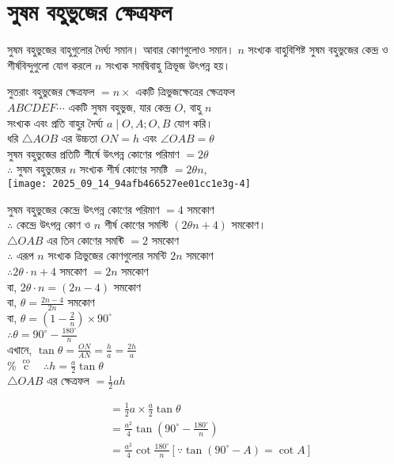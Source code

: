 \documentclass[10pt]{article}
\begin{document}
\section*{সুষম বহুভুজের ক্ষেত্রফল}
সুষম বহুভুজের বাহুগুলোর দৈর্ঘ্য সমান। আবার কোণগুলোও সমান। \(n\) সংখ্যক বাহুবিশিষ্ট সুষম বহুভুজের কেন্দ্র ও শীর্ষবিন্দুগুলো যোগ করলে \(n\) সংখ্যক সমদ্বিবাহু ত্রিভূজ উৎপন্ন হয়।

সুতরাং বহুভুজের ক্ষেত্রফল \(=n \times\) একটি ত্রিভুজক্ষেত্রের ক্ষেত্রফল\\
\(A B C D E F \cdots\) একটি সুষম বহুভুজ, যার কেন্দ্র \(O\), বাহু \(n\)\\
সংখ্যক এবং প্রতি বাহুর দৈর্ঘ্য \(a \mid O, A ; O, B\) যোগ করি।\\
ধরি \(\triangle A O B\) এর উচ্চতা \(O N=h\) এবং \(\angle O A B=\theta\)\\
সুষম বহুভুজের প্রতিটি শীর্ষে উৎপন্ন কোণের পরিমাণ \(=2 \theta\)\\
\(\therefore\) সুষম বহুভুজের \(n\) সংখ্যক শীর্ষ কোণের সমষ্টি \(=2 \theta n\),\\
\texttt{[image: 2025\_09\_14\_94afb466527ee01cc1e3g-4]}

সুষম বহুভুজের কেন্দ্রে উৎপন্ন কোণের পরিমাণ \(=4\) সমকোণ\\
\(\therefore\) কেন্দ্রে উৎপন্ন কোণ ও \(n\) শীর্ষ কোণের সমস্টি \((2 \theta n+4)\) সমকোণ।\\
\(\triangle O A B\) এর তিন কোণের সমব্টি \(=2\) সমকোণ\\
\(\therefore\) এরূপ \(n\) সংখ্যক ত্রিভুজের কোণগুলোর সমন্টি \(2 n\) সমকোণ\\
\(\therefore 2 \theta \cdot n+4\) সমকোণ \(=2 n\) সমকোণ\\
বা, \(2 \theta \cdot n=(2 n-4)\) সমকোণ\\
বা, \(\theta=\frac{2 n-4}{2 n}\) সমকোণ\\
বা, \(\theta=\left(1-\frac{2}{n}\right) \times 90^{\circ}\)\\
\(\therefore \theta=90^{\circ}-\frac{180^{\circ}}{n}\)\\
এখানে, \(\tan \theta=\frac{O N}{A N}=\frac{h}{a}=\frac{2 h}{a}\)\\
\% \(\stackrel{\text { co }}{\text { c }} \quad \therefore h=\frac{a}{2} \tan \theta\)\\
\(\triangle O A B\) এর ক্ষেত্রফল \(=\frac{1}{2} a h\)

\[
\begin{aligned}
& =\frac{1}{2} a \times \frac{a}{2} \tan \theta \\
& =\frac{a^{2}}{4} \tan \left(90^{\circ}-\frac{180^{\circ}}{n}\right) \\
& =\frac{a^{2}}{4} \cot \frac{180^{\circ}}{n}\left[\because \tan \left(90^{\circ}-A\right)=\cot A\right]
\end{aligned}
\]
\end{document}
